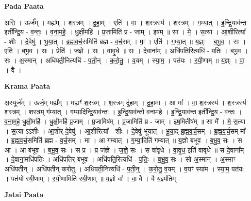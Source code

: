 \documentclass[17pt]{extarticle}
\begin{document}
\textbf{Pada Paata} \newline

अ॒सि॒ । ऊर्ज᳚म् । मह्य᳚म् । श॒स्त्रम् । दु॒हा॒म् । एति॑ । मा॒ । श॒स्त्रस्य॑ । श॒स्त्रम् । ग॒म्या॒त् । इ॒न्द्रि॒याव॑न्त॒ इती᳚न्द्रि॒य - व॒न्तः॒ । व॒ना॒म॒हे॒ । धु॒क्षी॒महि॑ । प्र॒जामिति॑ प्र - जाम् । इष᳚म् ॥ सा । मे॒ । स॒त्या । आ॒शीरित्या᳚ - शीः । दे॒वेषु॑ । भू॒या॒त् । ब्र॒ह्म॒व॒र्च॒समिति॑ ब्रह्म - व॒र्च॒सम् । मा॒ । एति॑ । ग॒म्या॒त् ॥ य॒ज्ञ्ः । ब॒भू॒व॒ । सः । एति॑ । ब॒भू॒व॒ । सः । प्रेति॑ । ज॒ज्ञे॒ । सः । वा॒वृ॒धे॒ ॥ सः । दे॒वाना᳚म् । अधि॑पति॒रित्यधि॑ - प॒तिः॒ । ब॒भू॒व॒ । सः । अ॒स्मान् । अधि॑पती॒नित्यधि॑ - प॒ती॒न् । क॒रो॒तु॒ । व॒यम् । स्या॒म॒ । पत॑यः । र॒यी॒णाम् ॥ य॒ज्ञ्ः । वा॒ । वै ।  \newline


\textbf{Krama Paata} \newline

अ॒स्यूर्ज᳚म् । ऊर्ज॒म् मह्य᳚म् । मह्यꣳ॑ श॒स्त्रम् । श॒स्त्रम् दु॑हाम् । दु॒हा॒मा । आ मा᳚ । मा॒ श॒स्त्रस्य॑ । श॒स्त्रस्य॑ श॒स्त्रम् । श॒स्त्रम् ग॑म्यात् । ग॒म्या॒दि॒न्द्रि॒याव॑न्तः । इ॒न्द्रि॒याव॑न्तो वनामहे । इ॒न्द्रि॒याव॑न्त॒ इती᳚न्द्रि॒य - व॒न्तः॒ । व॒ना॒म॒हे॒ धु॒क्षी॒महि॑ । धु॒क्षी॒महि॑ प्र॒जाम् । प्र॒जामिष᳚म् । प्र॒जामिति॑ प्र - जाम् । इष॒मितीष᳚म् ॥ सा मे᳚ । मे॒ स॒त्या । स॒त्या ऽऽशीः । आ॒शीर् दे॒वेषु॑ । आ॒शीरित्या᳚ - शीः । दे॒वेषु॑ भूयात् । भू॒या॒द् ब्र॒ह्म॒व॒र्च॒सम् । ब्र॒ह्म॒व॒र्च॒सम् मा᳚ । ब्र॒ह्म॒व॒र्च॒समिति॑ ब्रह्म - व॒र्च॒सम् । मा । आ ग॑म्यात् । ग॒म्या॒दिति॑ गम्यात् ॥ य॒ज्ञो ब॑भूव । ब॒भू॒व॒ सः । स आ । आ ब॑भूव । ब॒भू॒व॒ सः । स प्र । प्र ज॑ज्ञे । ज॒ज्ञे॒ सः । स वा॑वृधे । वा॒वृ॒ध॒ इति॑ वावृधे ॥ स दे॒वाना᳚म् । दे॒वाना॒मधि॑पतिः । अधि॑पतिर् बभूव । अधि॑पति॒रित्यधि॑ - प॒तिः॒ । ब॒भू॒व॒ सः । सो अ॒स्मान् । अ॒स्माꣳ अधि॑पतीन् । अधि॑पतीन् करोतु । अधि॑पती॒नित्यधि॑ - प॒ती॒न्॒ । क॒रो॒तु॒ व॒यम् । व॒यꣳ स्या॑म । स्या॒म॒ पत॑यः । पत॑यो रयी॒णाम् । र॒यी॒णामिति॑ रयी॒णाम् ॥ य॒ज्ञो वा᳚ । वा॒ वै । वै य॒ज्ञ्प॑तिम् \newline

\textbf{Jatai Paata} \newline
\end{document}
